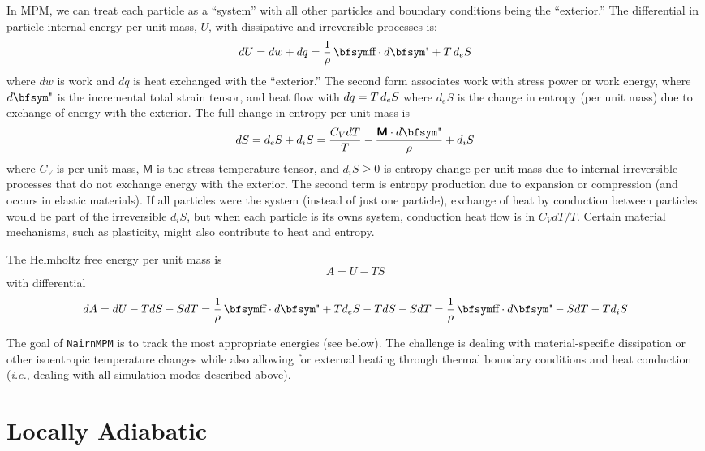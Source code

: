 \documentclass[11pt]{book}
\newcommand{\tens}[1]{\boldsymbol{\mathsf{#1}}}
\def\st{{\hbox{\bfsym\char'033}}}
\def\et{{\hbox{\bfsym\char'042}}}
\begin{document}
In MPM, we can treat each particle as a ``system'' with all other particles and boundary conditions being the ``exterior.''
The differential in particle internal energy per unit mass, $U$, with dissipative and irreversible processes is:
\begin{equation}%
      dU = dw + dq = {1\over \rho}\thinspace \st\cdot d\et + T \thinspace d_eS
\end{equation}%
where $dw$ is work and $dq$ is heat exchanged with the ``exterior.'' The second form associates work with stress power or work energy, where $d\et$ is the incremental total strain tensor, and heat flow with $dq = T \thinspace d_eS$ where $d_eS$ is the change in entropy (per unit mass) due to exchange of energy with the exterior. The full change in entropy per unit mass is
\begin{equation}%
      dS = d_eS + d_iS = {C_V dT\over T} - {\tens{M}\cdot d\et\over \rho} + d_iS
\end{equation}%
where $C_V$ is per unit mass, $\tens{M}$ is the stress-temperature tensor, and $d_iS\ge0$ is entropy change per unit mass due to internal irreversible processes that do not exchange energy with the exterior. The second term is entropy production due to expansion or compression (and occurs in elastic materials). If all particles were the system (instead of just one particle), exchange of heat by conduction between particles would be part of the irreversible $d_iS$, but when each particle is its owns system, conduction heat flow is in $C_VdT/T$. Certain material mechanisms, such as plasticity, might also contribute to heat and entropy.

The Helmholtz free energy per unit mass is
\begin{equation}%
     A = U - TS
\end{equation}%
with differential
\begin{equation}%
    dA = dU - TdS - SdT = {1\over \rho}\thinspace \st\cdot d\et + T d_eS - TdS - SdT
              = {1\over \rho}\thinspace \st\cdot d\et  - SdT - T d_iS
\end{equation}%

The goal of {\tt NairnMPM} is to track the most appropriate energies (see below). The challenge is dealing with material-specific dissipation or other isoentropic temperature changes while also allowing for external heating through thermal boundary conditions and heat conduction ({\em i.e.}, dealing with all simulation modes described above).

\section{Locally Adiabatic}
\end{document}
